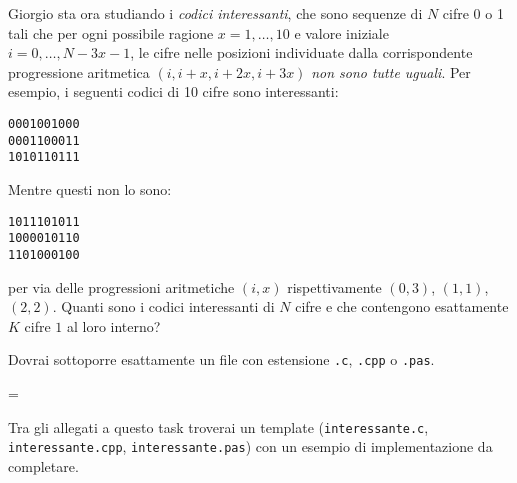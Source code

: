 \usepackage{xcolor}
\usepackage{afterpage}
\usepackage{pifont,mdframed}
\usepackage[bottom]{footmisc}

\makeatletter
\gdef\this@inputfilename{input.txt}
\gdef\this@outputfilename{output.txt}
\makeatother

\newcommand{\inputfile}{\texttt{input.txt}}
\newcommand{\outputfile}{\texttt{output.txt}}

\newenvironment{warning}
  {\par\begin{mdframed}[linewidth=2pt,linecolor=gray]%
    \begin{list}{}{\leftmargin=1cm
                   \labelwidth=\leftmargin}\item[\Large\ding{43}]}
  {\end{list}\end{mdframed}\par}

	Giorgio sta ora studiando i \emph{codici interessanti}, che sono sequenze di $N$ cifre 0 o 1 tali che per ogni possibile ragione $x = 1, \ldots, 10$ e valore iniziale $i = 0, \ldots, N-3x-1$, le cifre nelle posizioni individuate dalla corrispondente progressione aritmetica $(i,i+x,i+2x,i+3x)$ \emph{non sono tutte uguali}. Per esempio, i seguenti codici di 10 cifre sono interessanti:
	\begin{center}
	\texttt{0001001000\\
	0001100011\\
	1010110111}
	\end{center}
	Mentre questi non lo sono:
	\begin{center}
	\texttt{1011101011\\
	1000010110\\
	1101000100}
	\end{center}
	per via delle progressioni aritmetiche $(i,x)$ rispettivamente $(0,3)$, $(1,1)$, $(2,2)$. Quanti sono i codici interessanti di $N$ cifre e che contengono esattamente $K$ cifre $1$ al loro interno?

\Implementation
Dovrai sottoporre esattamente un file con estensione \texttt{.c}, \texttt{.cpp} o \texttt{.pas}.

\begin{warning}
Tra gli allegati a questo task troverai un template (\texttt{interessante.c}, \texttt{interessante.cpp}, \texttt{interessante.pas}) con un esempio di implementazione da completare.
\end{warning}


